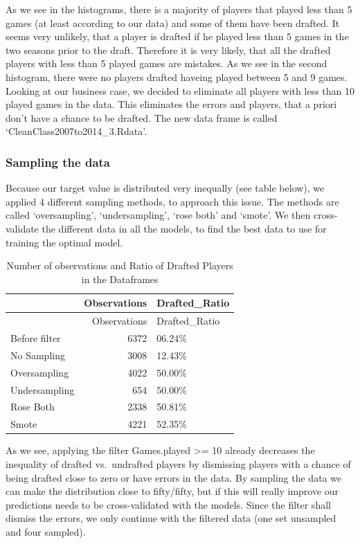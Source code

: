\documentclass[]{article}
\begin{document}
As we see in the histograms, there is a majority of players that played
less than 5 games (at least according to our data) and some of them have
been drafted. It seems very unlikely, that a player is drafted if he
played less than 5 games in the two seasons prior to the draft.
Therefore it is very likely, that all the drafted players with less than
5 played games are mistakes. As we see in the second histogram, there
were no players drafted haveing played between 5 and 9 games. Looking at
our business case, we decided to eliminate all players with less than 10
played games in the data. This eliminates the errors and players, that a
priori don't have a chance to be drafted. The new data frame is called
`CleanClass2007to2014\_3.Rdata'.

\hypertarget{sampling-the-data}{%
\subsubsection{Sampling the data}\label{sampling-the-data}}

Because our target value is distributed very inequally (see table
below), we applied 4 different sampling methods, to approach this issue.
The methods are called `oversampling', `undersampling', `rose both' and
`smote'. We then cross-validate the different data in all the models, to
find the best data to use for training the optimal model.

\begin{longtable}[]{@{}lrl@{}}
\caption{Number of observations and Ratio of Drafted Players in the
Dataframes}\tabularnewline
\toprule
& Observations & Drafted\_Ratio\tabularnewline
\midrule
\endfirsthead
\toprule
& Observations & Drafted\_Ratio\tabularnewline
\midrule
\endhead
Before filter & 6372 & 06.24\%\tabularnewline
No Sampling & 3008 & 12.43\%\tabularnewline
Oversampling & 4022 & 50.00\%\tabularnewline
Undersampling & 654 & 50.00\%\tabularnewline
Rose Both & 2338 & 50.81\%\tabularnewline
Smote & 4221 & 52.35\%\tabularnewline
\bottomrule
\end{longtable}

As we see, applying the filter Games.played \textgreater= 10 already
decreases the inequality of drafted vs.~undrafted players by dismissing
players with a chance of being drafted close to zero or have errors in
the data. By sampling the data we can make the distribution close to
fifty/fifty, but if this will really improve our predictions needs to be
cross-validated with the models. Since the filter shall dismiss the
errors, we only continue with the filtered data (one set unsampled and
four sampled).
\end{document}
